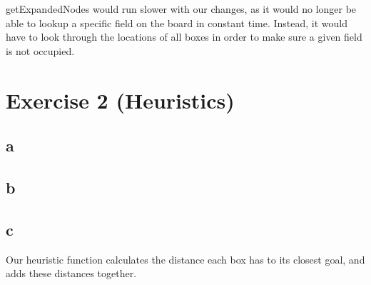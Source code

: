 \documentclass[12pt]{article}
\begin{document}
getExpandedNodes would run slower with our changes, as it would no longer be able to lookup a specific field on the board in constant time. Instead, it would have to look through the locations of all boxes in order to make sure a given field is not occupied.

\section{Exercise 2 (Heuristics)}
\label{sec:Exercise 2 (Heuristics)}

\subsection{a}
\label{sub:a}



\subsection{b}
\label{sub:b}


\subsection{c}
\label{sub:c}

Our heuristic function calculates the distance each box has to its closest goal, and adds these distances together. 
\end{document}
